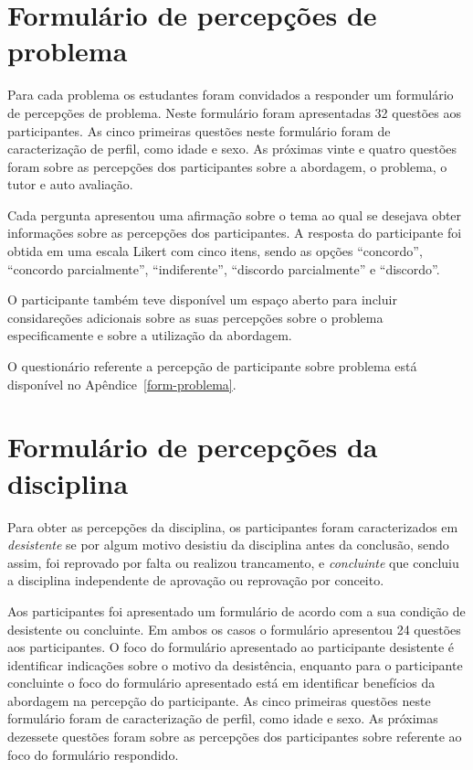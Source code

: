 \section{Formulário de percepções de problema}
\label{form-percepcoes}
Para cada problema os estudantes foram convidados a responder um formulário de percepções de problema.
Neste formulário foram apresentadas 32 questões aos participantes.
As cinco primeiras questões neste formulário foram de caracterização de perfil, como
idade e sexo.
As próximas vinte e quatro questões foram sobre as percepções dos participantes sobre a abordagem, o
problema, o tutor e auto avaliação.

Cada pergunta apresentou uma afirmação sobre o tema ao qual se desejava obter informações sobre as
percepções dos participantes.
A resposta do participante foi obtida em uma escala Likert com cinco itens, sendo as opções
``concordo'', ``concordo parcialmente'', ``indiferente'', ``discordo parcialmente'' e ``discordo''.

O participante também teve disponível um espaço aberto para incluir considareções adicionais sobre
as suas percepções sobre o problema especificamente e sobre a utilização da abordagem.

O questionário referente a percepção de participante sobre problema está disponível no Apêndice~\ref{form-problema}.

\section{Formulário de percepções da disciplina}
\label{form-disciplinas}
Para obter as percepções da disciplina, os participantes foram caracterizados em \textit{desistente}
se por algum motivo desistiu da disciplina antes da conclusão, sendo assim, foi reprovado por
falta ou realizou trancamento, e \textit{concluinte} que concluiu a disciplina independente
de aprovação ou reprovação por conceito.

Aos participantes foi apresentado um formulário de acordo com a sua condição de desistente
ou concluinte.
Em ambos os casos o formulário apresentou 24 questões aos participantes.
O foco do formulário apresentado ao participante desistente é identificar indicações
sobre o motivo da desistência, enquanto para o participante concluinte o foco do
formulário apresentado está em identificar benefícios da abordagem na percepção
do participante.
As cinco primeiras questões neste formulário foram de caracterização de perfil, como
idade e sexo.
As próximas dezessete questões foram sobre as percepções dos participantes sobre referente
ao foco do formulário respondido.

